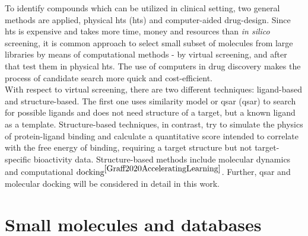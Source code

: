 To identify compounds which can be utilized in clinical setting, two general methods are applied, physical \acrlong{hts} (\acrshort{hts}) and computer-aided drug-design.
Since \acrshort{hts} is expensive and takes more time, money and resources than \textit{in silico }screening, it is common approach to select small subset of molecules from large libraries by means of computational methods - by virtual screening, and after that test them in physical \acrshort{hts}.
The use of computers in drug discovery makes the process of candidate search more quick and cost-efficient.\\

With respect to virtual screening, there are two different techniques: ligand-based and structure-based.
The first one uses similarity model or \acrlong{qsar} (\acrshort{qsar}) to search for possible ligands and does not need structure of a target, but a known ligand as a template.
Structure-based techniques, in contrast, try to simulate the physics of protein-ligand binding and calculate a quantitative score intended to correlate with the free energy of binding, requiring a target structure but not target-specific bioactivity data.
Structure-based methods include molecular dynamics and computational $\text{docking}^{\cite{Graff2020AcceleratingLearning}}$. Further, \acrshort{qsar} and molecular docking will be considered in detail in this work.\\

\section{Small molecules and databases}

